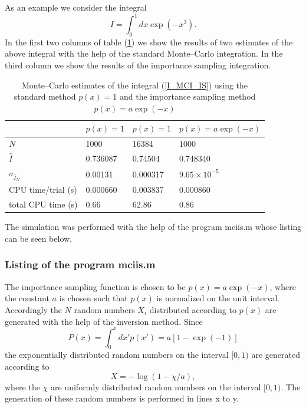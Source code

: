 As an example we consider the integral
\begin{equation}
\label{I_MCI_IS}
I= \int_0^1 dx \exp(-x^2).
\end{equation}
In the first two columns of table (\ref{T_MCI_IS}) we show
the results of two estimates of the above integral with the 
help of the standard Monte--Carlo integration. In the third column 
we show the results of the importance sampling integration.

\begin{table}\label{T_MCI_IS}
\caption{Monte--Carlo estimates of the integral (\ref{I_MCI_IS})
using the standard method $p(x)=1$ and the importance sampling method
$p(x)=a\exp(-x)$}
\begin{center}
\begin{tabular}{llll}\hline \hline
 ~             & $p(x) =1$ & $p(x) =1$ & $p(x)=a\exp(-x)$ \\ \hline
$N$            & 1000      & 16384      & 1000           \\
$\hat{I}$            & 0.736087  & 0.74504    & 0.748340        \\
$\sigma_{\hat{I}_N}$     & 0.00131   & 0.000317   & $9.65 \times 10^{-5}$ \\
CPU time/trial (s) & 0.000660  & 0.003837   & 0.000860  \\
total CPU time (s) & 0.66      & 62.86      & 0.86  \\ 
    \hline  \hline
\end{tabular}
\end{center}
\end{table}
The simulation was performed with the help of the program
{\sf mciis.m} whose listing can be seen below.

\subsubsection{Listing of the program mciis.m}

The importance sampling function is chosen to be $p(x)=a\exp(-x)$,
where the constant $a$ is chosen such that $p(x)$ is normalized
on the  unit interval. Accordingly the $N$ random numbers $X_i$
distributed according to $p(x)$ are generated with the help of the
inversion method. Since
\begin{equation*}
P(x) = \int_0^x dx' p(x') = a[1-\exp(-1)]
\end{equation*}
the exponentially distributed random numbers on the interval $[0,1)$
are generated according to
\begin{equation*}
X = - \log(1- \chi/a),
\end{equation*}
where the $\chi$ are uniformly distributed random numbers on the 
interval $[0,1)$. The generation of these random numbers is 
performed in lines x to y.

